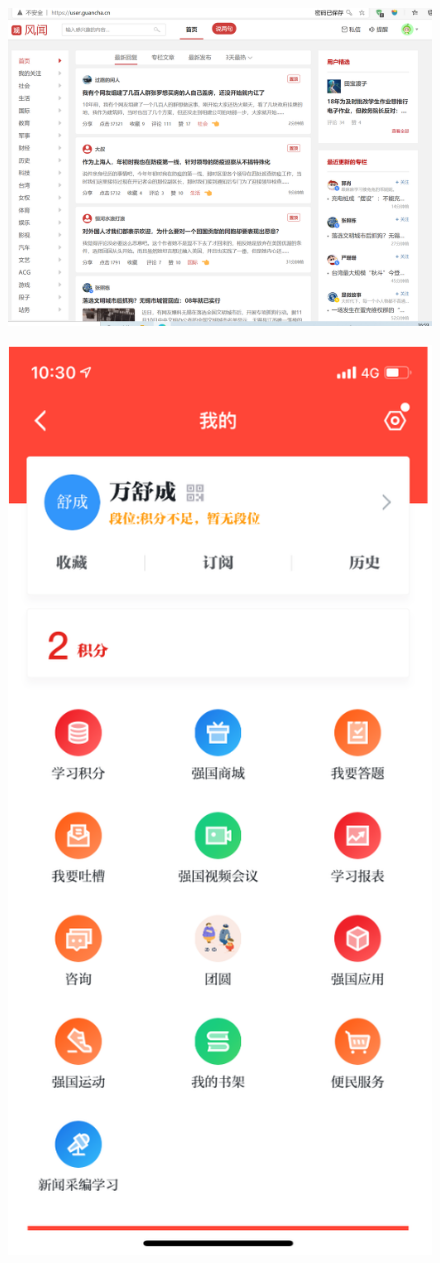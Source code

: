 \documentclass{article}
\begin{document}
    \begin{figure}[H]
    	\centering
    	\includegraphics[width=0.7\linewidth]{观察者}
    	\caption{}
    	\label{fig:}
    \end{figure}
    
    \begin{figure}[H]
    	\centering
    	\includegraphics[width=0.7\linewidth]{学习强国}
    	\caption{}
    	\label{fig:}
    \end{figure}
    
\end{document}

